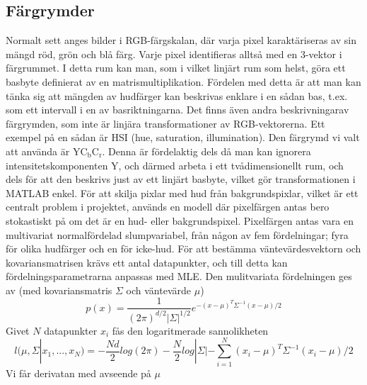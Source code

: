 \documentclass[../rapport_MVEX01-11-05]{subfiles}
\begin{document}
\subsection{Färgrymder}
Normalt sett anges bilder i RGB-färgskalan, där varja pixel
karaktäriseras av sin mängd röd, grön och blå färg. Varje pixel
identifieras alltså med en 3-vektor i färgrummet. I detta rum kan man,
som i vilket linjärt rum som helst, göra ett basbyte definierat av en
matrismultiplikation. Fördelen med detta är att man kan tänka sig att
mängden av hudfärger kan beskrivas enklare i en sådan bas, t.ex. som
ett intervall i en av basriktningarna. Det finns även andra
beskrivningarav färgrymden, som inte är linjära transformationer av
RGB-vektorerna. Ett exempel på en sådan är HSI (hue, saturation,
illumination).%
Den färgrymd vi valt att använda är $\mathrm{YC_bC_r}$. Denna är
fördelaktig dels då man kan ignorera intensitetskomponenten Y, och
därmed arbeta i ett tvådimensionellt rum, och dels för att den
beskrivs just av ett linjärt basbyte, vilket gör transformationen i
MATLAB enkel.
För att skilja pixlar med hud från bakgrundspixlar, vilket är ett
centralt problem i projektet, används en modell där pixelfärgen antas
bero stokastiskt på om det är en hud- eller
bakgrundspixel. Pixelfärgen antas vara en multivariat normalfördelad
slumpvariabel, från någon av fem fördelningar; fyra för olika
hudfärger och en för icke-hud.
 För att bestämma väntevärdesvektorn och kovariansmatrisen krävs ett
 antal datapunkter, och till detta kan fördelningsparametrarna
 anpassas med MLE. Den mulitvariata fördelningen ges av (med kovariansmatris
 $\Sigma$ och väntevärde $\mu$)
\begin{equation}
p(x)=\frac{1}{(2\pi)^{d/2}|\Sigma|^{1/2}}e^{-(x-\mu)^T\Sigma^{-1}(x-\mu)/2}
\end{equation}
Givet $N$ datapunkter $x_i$ fås den logaritmerade sannolikheten
\begin{equation}
l(\mu,\Sigma|x_1,...,x_N)=-\frac{Nd}{2}log(2\pi)-\frac{N}{2}log|\Sigma|-\sum_{i=1}^N(x_i-\mu)^T\Sigma^{-1}(x_i-\mu)/2
\end{equation}
Vi får derivatan med avseende på $\mu$
\end{document}
